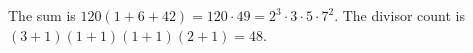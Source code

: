The sum is $120(1+6+42)=120\cdot49=2^3\cdot3\cdot5\cdot7^2$. The divisor count is $(3+1)(1+1)(1+1)(2+1)=\boxed{48}$.
